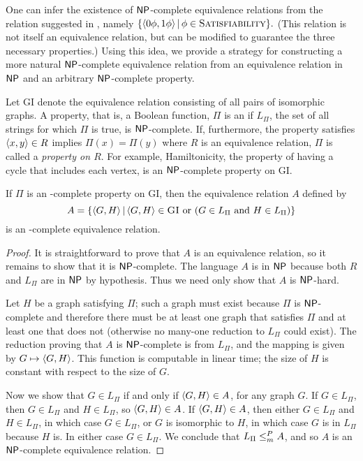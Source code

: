 One can infer the existence of ${\mathsf{NP}}$-complete equivalence relations from the relation suggested in \autocite[Section~6.2]{fg11}, namely $\{\langle0\phi,1\phi\rangle \, | \, \phi \in \textsc{Satisfiability}\}.$
(This relation is not itself an equivalence relation, but can be modified to guarantee the three necessary properties.)
Using this idea, we provide a strategy for constructing a more natural ${\mathsf{NP}}$-complete equivalence relation from an equivalence relation in ${\mathsf{NP}}$ and an arbitrary ${\mathsf{NP}}$-complete property.

Let \textsc{GI} denote the equivalence relation consisting of all pairs of isomorphic graphs.
A property, that is, a Boolean function, $\Pi$ is an  if $L_\Pi$, the set of all strings for which $\Pi$ is true, is ${\mathsf{NP}}$-complete.
If, furthermore, the property satisfies $\langle x,y\rangle \in R$ implies $\Pi(x) = \Pi(y)$ where $R$ is an equivalence relation, $\Pi$ is called a \emph{property on $R$}.
For example, Hamiltonicity, the property of having a cycle that includes each vertex, is an ${\mathsf{NP}}$-complete property on \textsc{GI}.

\begin{theorem}\label{thm:npceqrel}
  If $\Pi$ is an \NP-complete property on \textsc{GI}, then the equivalence relation $A$ defined by
  \begin{equation*}
    A = \left\{ \langle G,H\rangle \, \middle| \, \langle G,H\rangle \in \textsc{GI} \text{ or } (G \in L_\Pi \text{ and } H \in L_\Pi) \right\}
  \end{equation*}
  is an \NP-complete equivalence relation.
\end{theorem}
\begin{proof}
  It is straightforward to prove that $A$ is an equivalence relation, so it remains to show that it is ${\mathsf{NP}}$-complete.
  The language $A$ is in ${\mathsf{NP}}$ because both $R$ and $L_\Pi$ are in ${\mathsf{NP}}$ by hypothesis.
  Thus we need only show that $A$ is ${\mathsf{NP}}$-hard.

  Let $H$ be a graph satisfying $\Pi$; such a graph must exist because $\Pi$ is ${\mathsf{NP}}$-complete and therefore there must be at least one graph that satisfies $\Pi$ and at least one that does not (otherwise no many-one reduction to $L_\Pi$ could exist).
  The reduction proving that $A$ is ${\mathsf{NP}}$-complete is from $L_\Pi$, and the mapping is given by $G \mapsto \langle G,H\rangle$.
  This function is computable in linear time; the size of $H$ is constant with respect to the size of $G$.

  Now we show that $G \in L_\Pi$ if and only if $\langle G,H\rangle \in A$, for any graph $G$.
  If $G \in L_\Pi$, then $G \in L_\Pi$ and $H \in L_\Pi$, so $\langle G,H\rangle \in A$.
  If $\langle G,H\rangle \in A$, then either $G \in L_\Pi$ and $H \in L_\Pi$, in which case $G \in L_\Pi$, or $G$ is isomorphic to $H$, in which case $G$ is in $L_\Pi$ because $H$ is.
  In either case $G \in L_\Pi$.
  We conclude that $L_\Pi \leq^{P}_{m} A$, and so $A$ is an ${\mathsf{NP}}$-complete equivalence relation.
\end{proof}

